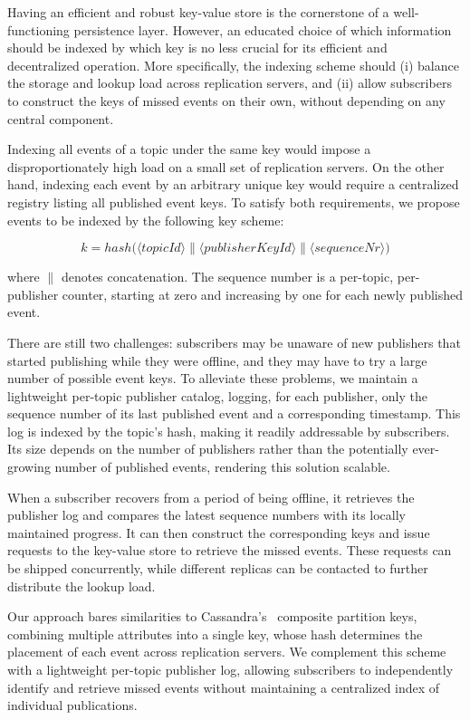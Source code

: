 Having an efficient and robust key-value store is the cornerstone of a well-functioning persistence layer. 
However, an educated choice of which information should be indexed by which key is no less crucial for its efficient and decentralized operation.
More specifically, the indexing scheme should (i) balance the storage and lookup load across replication servers, and (ii) allow subscribers to construct the keys of missed events on their own, without depending on any central component.

Indexing all events of a topic under the same key would impose a disproportionately high load on a small set of replication servers.
On the other hand, indexing each event by an arbitrary unique key would require a centralized registry listing all published event keys.
To satisfy both requirements, we propose events to be indexed by the following key scheme:

\[
    k = hash\big(
        \langle topicId \rangle \parallel
        \langle publisherKeyId \rangle \parallel
        \langle sequenceNr \rangle
    \big)
\]

where $\parallel$ denotes concatenation. 
The sequence number is a per-topic, per-publisher counter, starting at zero and increasing by one for each newly published event.

There are still two challenges: subscribers may be unaware of new publishers that started publishing while they were offline, and they may have to try a large number of possible event keys.
To alleviate these problems, we maintain a lightweight per-topic publisher catalog, logging, for each publisher, only the sequence number of its last published event and a corresponding timestamp. 
This log is indexed by the topic's hash, making it readily addressable by subscribers. 
Its size depends on the number of publishers rather than the potentially ever-growing number of published events, rendering this solution scalable.

When a subscriber recovers from a period of being offline, it retrieves the publisher log and compares the latest sequence numbers with its locally maintained progress.
It can then construct the corresponding keys and issue requests to the key-value store to retrieve the missed events. 
These requests can be shipped concurrently, while different replicas can be contacted to further distribute the lookup load.

Our approach bares similarities to Cassandra's~\cite{Cassandra} composite partition keys, combining multiple attributes into a single key, whose hash determines the placement of each event across replication servers.
We complement this scheme with a lightweight per-topic publisher log, allowing subscribers to independently identify and retrieve missed events without maintaining a centralized index of individual publications.
